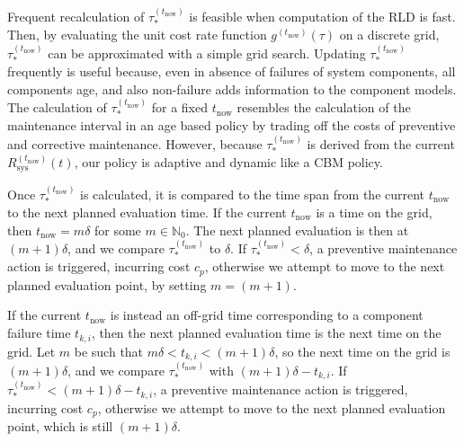 \documentclass[authoryear]{elsarticle}
\newcommand{\naturals}{\mathbb{N}}
\def\yknow{y_k^{(\tnow)}}
\def\nknow{n_k^{(\tnow)}}
\def\tnow{t_\text{now}}
\def\tpnow{t^+_\text{now}}
\newcommand{\Rsysnow}{R^{(t_\text{now})}_\text{sys}}
\newcommand{\gnow}{g^{(\tnow)}}
\newcommand{\tausnow}{\tau_*^{(\tnow)}}
\begin{document}
Frequent recalculation of $\tausnow$ is feasible
when computation of the RLD is fast.
Then, by evaluating the unit cost rate function $\gnow(\tau)$ on a discrete grid,
$\tausnow$ can be approximated with a simple grid search.
Updating $\tausnow$ frequently is useful because,
even in absence of failures of system components,
all components age, and also non-failure adds information to the component models.
%
The calculation of $\tausnow$ for a fixed $\tnow$ resembles the calculation
of the maintenance interval in an age based policy by trading off the costs of preventive and corrective maintenance.
However, because $\tausnow$ is derived from the current $\Rsysnow(t)$,
our policy is adaptive and dynamic like a CBM policy. 

Once $\tausnow$ is calculated, it is compared to the time span from the current $\tnow$ to the next planned evaluation time.
If the current $\tnow$ is a time on the grid, then $\tnow = m \delta$ for some $m \in \naturals_0$.
The next planned evaluation is then at $(m + 1) \delta$,
and we compare $\tausnow$ to $\delta$.
If $\tausnow < \delta$, a preventive maintenance action is triggered, incurring cost $c_p$,
otherwise we attempt to move to the next planned evaluation point, by setting $m =  (m + 1)$.

If the current $\tnow$ is instead an off-grid time corresponding to a component failure time $t_{k,i}$,
then the next planned evaluation time is the next time on the grid.
Let $m$ be such that $m \delta < t_{k,i} < (m + 1) \delta$,
so the next time on the grid is $(m + 1) \delta$,
and we compare $\tausnow$ with $(m + 1) \delta - t_{k,i}$.
If $\tausnow < (m + 1) \delta - t_{k,i}$, a preventive maintenance action is triggered, incurring cost $c_p$,
otherwise we attempt to move to the next planned evaluation point, which is still $(m + 1) \delta$.
\end{document}
